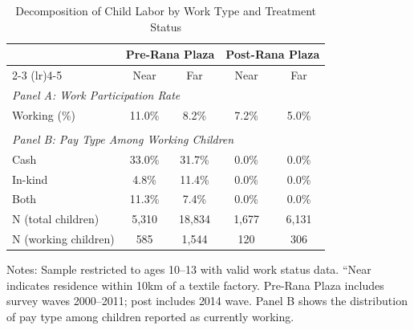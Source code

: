\begin{table}[H]
\centering
\caption{Decomposition of Child Labor by Work Type and Treatment Status}
\label{tab:decomposition}
\begin{threeparttable}
\begin{tabular}{lcccc}
\toprule
& \multicolumn{2}{c}{Pre-Rana Plaza} & \multicolumn{2}{c}{Post-Rana Plaza} \\
\cmidrule(lr){2-3} \cmidrule(lr){4-5}
& Near & Far & Near & Far \\
\midrule
\multicolumn{5}{l}{\textit{Panel A: Work Participation Rate}} \\
\quad Working (\%) & 11.0\% & 8.2\% & 7.2\% & 5.0\% \\
\\
\multicolumn{5}{l}{\textit{Panel B: Pay Type Among Working Children}} \\
\quad Cash & 33.0\% & 31.7\% & 0.0\% & 0.0\% \\
\quad In-kind & 4.8\% & 11.4\% & 0.0\% & 0.0\% \\
\quad Both & 11.3\% & 7.4\% & 0.0\% & 0.0\% \\
\midrule
N (total children) & 5,310 & 18,834 & 1,677 & 6,131 \\
N (working children) & 585 & 1,544 & 120 & 306 \\
\bottomrule
\end{tabular}
\begin{tablenotes}
\footnotesize
\item Notes: Sample restricted to ages 10--13 with valid work status data. ``Near indicates residence within 10km of a textile factory. Pre-Rana Plaza includes survey waves 2000--2011; post includes 2014 wave. Panel B shows the distribution of pay type among children reported as currently working.
\end{tablenotes}
\end{threeparttable}
\end{table}
